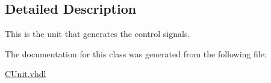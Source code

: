 \subsection{Detailed Description}
This is the unit that generates the control signals. 

The documentation for this class was generated from the following file\-:\begin{DoxyCompactItemize}
\item 
\hyperlink{_c_unit_8vhdl}{C\-Unit.\-vhdl}\end{DoxyCompactItemize}
